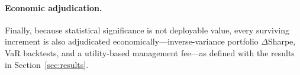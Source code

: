 \paragraph{Economic adjudication.}
Finally, because statistical significance is not deployable value, every surviving increment is also adjudicated economically---inverse-variance portfolio $\Delta$Sharpe, VaR backtests, and a utility-based management fee---as defined with the results in Section~\ref{sec:results}.

